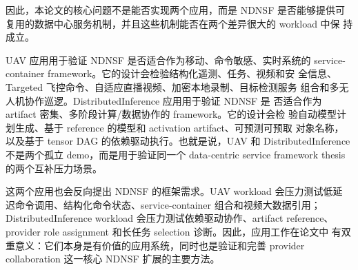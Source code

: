 因此，本论文的核心问题不是能否实现两个应用，而是 NDNSF 是否能够提供可
复用的数据中心服务机制，并且这些机制能否在两个差异很大的 workload 中保
持成立。

UAV 应用用于验证 NDNSF 是否适合作为移动、命令敏感、实时系统的
service-container framework。它的设计会检验结构化遥测、任务、视频和安
全信息、Targeted 飞控命令、自适应直播视频、加密本地录制、目标检测服务
组合和多无人机协作巡逻。DistributedInference 应用用于验证 NDNSF 是
否适合作为 artifact 密集、多阶段计算/数据协作的 framework。它的设计会检
验自动模型计划生成、基于 reference 的模型和 activation artifact、可预测可预取
对象名称，以及基于 tensor DAG 的依赖驱动执行。也就是说，UAV 和
DistributedInference 不是两个孤立 demo，而是用于验证同一个 data-centric
service framework thesis 的两个互补压力场景。

这两个应用也会反向提出 NDNSF 的框架需求。UAV workload 会压力测试低延
迟命令调用、结构化命令状态、service-container 组合和视频大数据引用；
DistributedInference workload 会压力测试依赖驱动协作、artifact reference、
provider role assignment 和长任务 selection 诊断。因此，应用工作在论文中
有双重意义：它们本身是有价值的应用系统，同时也是验证和完善 provider
collaboration 这一核心 NDNSF 扩展的主要方法。
